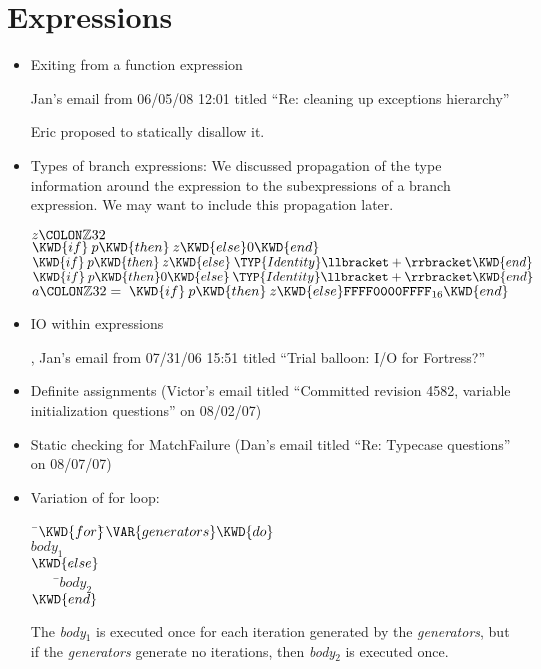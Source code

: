 \section{Expressions}
\begin{itemize}
\item Exiting from a function expression

Jan's email from 06/05/08 12:01
titled ``Re: cleaning up exceptions hierarchy''

Eric proposed to statically disallow it.

\item Types of branch expressions:
We discussed propagation of the type information around the expression to the subexpressions of a branch expression. We may want to include this propagation later.

\begin{Fortress}
\(z\COLON \mathbb{Z}32\)\\
\(\KWD{if}\:p \KWD{then}\:z \KWD{else} 0 \KWD{end}\)\\
\(\KWD{if}\:p \KWD{then}\:z \KWD{else}\:\TYP{Identity}\llbracket+\rrbracket \KWD{end}\)\\
\(\KWD{if}\:p \KWD{then} 0 \KWD{else}\:\TYP{Identity}\llbracket+\rrbracket \KWD{end}\)\\[4pt]
\(a\COLON \mathbb{Z}32 = \;\KWD{if}\:p \KWD{then}\:z \KWD{else} \mathtt{FFFF0000FFFF}_{16} \KWD{end}\)
\end{Fortress}

\item IO within  expressions

,
Jan's email from 07/31/06 15:51
titled ``Trial balloon: I/O for Fortress?''

\item Definite assignments (Victor's email titled ``Committed revision 4582, variable initialization questions'' on 08/02/07)
\item Static checking for MatchFailure (Dan's email titled ``Re: Typecase questions'' on 08/07/07)
\item Variation of for loop:

\begin{Fortress}
{\tt~}\pushtabs\=\+\( \KWD{for}  \null\)\pushtabs\=\+\(\VAR{generators} \KWD{do}\)\\
\(     {body}_{1}\)\-\\\poptabs
\( \KWD{else}\)\\
{\tt~~~~}\pushtabs\=\+\(     {body}_{2}\)\-\\\poptabs
\( \KWD{end}\)\-\\\poptabs
\end{Fortress}
The \emph{body}$_1$ is executed once for each iteration generated by the \emph{generators}, but if the \emph{generators} generate no iterations, then \emph{body}$_2$ is executed once.
\end{itemize}

